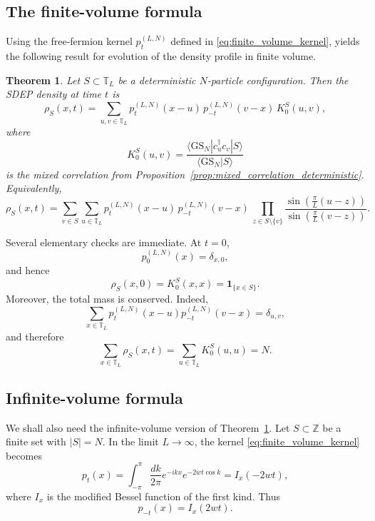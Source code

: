 \documentclass[11pt]{article}
\numberwithin{equation}{section}
\newtheorem{theorem}{Theorem}[section]
\newcommand{\1}{\mathbf 1}
\begin{document}
\subsection{The finite-volume formula}
Using the free-fermion kernel \(p_t^{(L,N)}\) defined in
\eqref{eq:finite_volume_kernel}, yields the following result for evolution of the density profile in finite volume.
\begin{theorem}
\label{thm:exact_density_formula}
Let \(S\subset\mathbb T_L\) be a deterministic \(N\)-particle configuration.
Then the SDEP density at time \(t\) is
\begin{equation}
    \rho_S(x,t)
    =
    \sum_{u,v\in\mathbb T_L}
    p_t^{(L,N)}(x-u)\,
    p_{-t}^{(L,N)}(v-x)\,
    K^S_0(u,v),
    \label{eq:exact_density_formula_finite}
\end{equation}
where
\[
    K^S_0(u,v)
    =
    \frac{
    \langle \mathrm{GS}_N|c_u^\dagger c_v|S\rangle
    }{
    \langle \mathrm{GS}_N|S\rangle
    }
\]
is the mixed correlation from
Proposition~\ref{prop:mixed_correlation_deterministic}.  Equivalently,
\begin{equation}
    \rho_S(x,t)
    =
    \sum_{v\in S}
    \sum_{u\in\mathbb T_L}
    p_t^{(L,N)}(x-u)\,
    p_{-t}^{(L,N)}(v-x)\,
    \prod_{z\in S\setminus\{v\}}
    \frac{
    \sin\left(\frac{\pi}{L}(u-z)\right)
    }{
    \sin\left(\frac{\pi}{L}(v-z)\right)
    }.
    \label{eq:exact_density_formula_finite_explicit}
\end{equation}
\end{theorem}

Several elementary checks are immediate.  At \(t=0\),
\[
    p_0^{(L,N)}(x)=\delta_{x,0},
\]
and hence
\[
    \rho_S(x,0)=K_0^S(x,x)=\mathbf 1_{\{x\in S\}}.
\]
Moreover, the total mass is conserved.  Indeed,
\[
    \sum_{x\in\mathbb T_L}
    p_t^{(L,N)}(x-u)p_{-t}^{(L,N)}(v-x)
    =
    \delta_{u,v},
\]
and therefore
\[
    \sum_{x\in\mathbb T_L}\rho_S(x,t)
    =
    \sum_{u\in\mathbb T_L}K_0^S(u,u)
    =
    N.
\]

\subsection{Infinite-volume formula}

We shall also need the infinite-volume version of
Theorem~\ref{thm:exact_density_formula}.  Let \(S\subset\mathbb Z\) be a finite
set with \(|S|=N\).  In the limit \(L\to\infty\), the kernel
\eqref{eq:finite_volume_kernel} becomes
\begin{equation}
    p_t(x)
    =
    \int_{-\pi}^{\pi}
    \frac{dk}{2\pi}
    e^{-ikx}e^{-2wt\cos k}
    =
    I_x(-2wt),
    \label{eq:infinite_kernel_bessel}
\end{equation}
where \(I_x\) is the modified Bessel function of the first kind.  Thus
\[
    p_{-t}(x)=I_x(2wt).
\]
\end{document}
